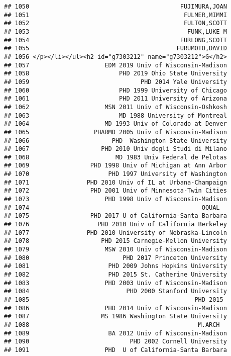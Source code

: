 \documentclass[
]{article}
\begin{document}
\begin{verbatim}
## 1050                                          FUJIMURA,JOAN
## 1051                                           FULMER,MIMMI
## 1052                                           FULTON,SCOTT
## 1053                                            FUNK,LUKE M
## 1054                                          FURLONG,SCOTT
## 1055                                         FURUMOTO,DAVID
## 1056 </p></li></ul><h2 id="g7303212" name="g7303212">G</h2>
## 1057                     EDM 2019 Univ of Wisconsin-Madison
## 1058                         PHD 2019 Ohio State University
## 1059                               PHD 2014 Yale University
## 1060                         PHD 1999 University of Chicago
## 1061                         PHD 2011 University of Arizona
## 1062                     MSN 2011 Univ of Wisconsin-Oshkosh
## 1063                         MD 1988 University of Montreal
## 1064                     MD 1993 Univ of Colorado at Denver
## 1065                  PHARMD 2005 Univ of Wisconsin-Madison
## 1066                       PHD  Washington State University
## 1067                    PHD 2010 Univ degli Studi di Milano
## 1068                        MD 1983 Univ Federal de Pelotas
## 1069                 PHD 1998 Univ of Michigan at Ann Arbor
## 1070                      PHD 1997 University of Washington
## 1071                PHD 2010 Univ of IL at Urbana-Champaign
## 1072                 PHD 2001 Univ of Minnesota-Twin Cities
## 1073                     PHD 1998 Univ of Wisconsin-Madison
## 1074                                                OQUAL  
## 1075                 PHD 2017 U of California-Santa Barbara
## 1076                   PHD 2010 Univ of California Berkeley
## 1077                PHD 2010 University of Nebraska-Lincoln
## 1078                    PHD 2015 Carnegie-Mellon University
## 1079                     MSW 2010 Univ of Wisconsin-Madison
## 1080                          PHD 2017 Princeton University
## 1081                      PHD 2009 Johns Hopkins University
## 1082                      PHD 2015 St. Catherine University
## 1083                     PHD 2003 Univ of Wisconsin-Madison
## 1084                           PHD 2000 Stanford University
## 1085                                              PHD 2015 
## 1086                     PHD 2014 Univ of Wisconsin-Madison
## 1087                    MS 1986 Washington State University
## 1088                                               M.ARCH  
## 1089                      BA 2012 Univ of Wisconsin-Madison
## 1090                            PHD 2002 Cornell University
## 1091                     PHD  U of California-Santa Barbara

\end{verbatim}
\end{document}
